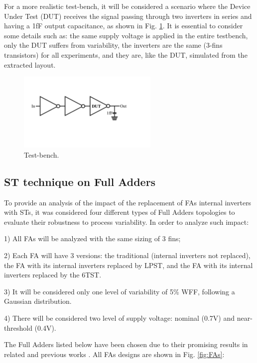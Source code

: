 \documentclass[diss,pgmicro,english]{iiufrgs}
\begin{document}
 For a more realistic test-bench, it will be considered a scenario where the Device Under Test (DUT) receives the signal passing through two inverters in series and having a 1fF output capacitance, as shown in Fig. \ref{fig:tbST}. It is essential to consider some details such as: the same supply voltage is applied in the entire testbench, only the DUT suffers from variability, the inverters are the same (3-fins transistors) for all experiments, and they are, like the DUT, simulated from the extracted layout.

\begin{figure}[]
\centering
\includegraphics[width=0.6\textwidth, trim={2cm 7cm 6cm 5cm},clip]{testbench.pdf}
\caption{Test-bench.}
\label{fig:tbST}
\end{figure}

\subsection{ST technique on Full Adders}

To provide an analysis of the impact of the replacement of FAs internal inverters with STs, it was considered four different types of Full Adders topologies to evaluate their robustness to process variability. In order to analyze such impact:

1) All FAs will be analyzed with the same sizing of 3 fins;

2) Each FA will have 3 versions: the traditional (internal inverters not replaced), the FA with its internal inverters replaced by LPST, and the FA with its internal inverters replaced by the 6TST.

3) It will be considered only one level of variability of 5\% WFF, following a Gaussian distribution.

4) There will be considered two level of supply voltage: nominal (0.7V) and near-threshold (0.4V).

The Full Adders listed below have been chosen due to their promising results in related and previous works \cite{ames2016investigating,dokania2015circuit,dokania2013investigation,moraes2018evaluation}. All FAs designs are shown in Fig. \ref{fig:FAs}:
\end{document}

